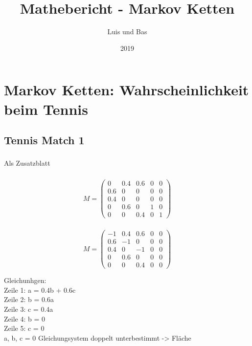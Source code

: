 \documentclass{article}
\title{Mathebericht - Markov Ketten}
\author{Luis und Bas}
\date{2019}
\begin{document}
\maketitle


\section{Markov Ketten: Wahrscheinlichkeit beim Tennis}
\subsection{Tennis Match 1}
\subsubsection{} Als Zusatzblatt
\subsubsection{} 
\[
M=
  \begin{pmatrix}
    0 & 0.4 & 0.6 & 0 & 0 \\
    0.6 & 0 & 0 & 0 & 0 \\
    0.4 & 0 & 0 & 0 & 0 \\
    0 & 0.6 & 0 & 1 & 0 \\
    0 & 0 & 0.4 & 0 & 1
    
  \end{pmatrix}
\]
\subsubsection{}
\[
M=
  \begin{pmatrix}
    -1 & 0.4 & 0.6 & 0 & 0 \\
    0.6 & -1 & 0 & 0 & 0 \\
    0.4 & 0 & -1 & 0 & 0 \\
    0 & 0.6 & 0 & 0 & 0 \\
    0 & 0 & 0.4 & 0 & 0
    
  \end{pmatrix}
\]

\vspace{5mm}
Gleichunhgen: \\
Zeile 1: a = 0.4b + 0.6c \\
Zeile 2: b = 0.6a \\
Zeile 3: c = 0.4a \\
Zeile 4: b = 0 \\
Zeile 5: c = 0 \\

\vspace{5mm}
a, b, c = 0
Gleichungsystem doppelt unterbestimmt -> Fläche
\end{document}
